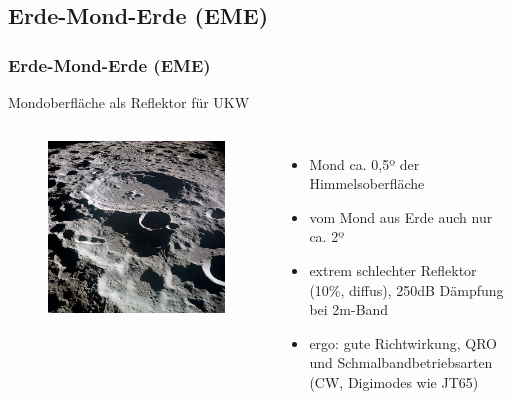 \subsection[EME]{Erde-Mond-Erde (EME)}

\begin{frame}
  \frametitle{Erde-Mond-Erde (EME)}

  Mondoberfläche als Reflektor für UKW

  \begin{columns}
      \begin{center}
        \begin{figure}
          \includegraphics[width=\textwidth,height=.7\textheight,keepaspectratio]{bv11/Lunar_crater_Daedalus.jpg}
        \end{figure}
      \end{center}
      \begin{itemize}
        \item Mond ca. 0,5º der Himmelsoberfläche
        \item vom Mond aus Erde auch nur ca. 2º
        \item extrem schlechter Reflektor (10\%, diffus), 250dB Dämpfung bei 2m-Band
        \item ergo: gute Richtwirkung, QRO und Schmalbandbetriebsarten (CW, Digimodes wie JT65)
      \end{itemize}
  \end{columns}

\end{frame}

